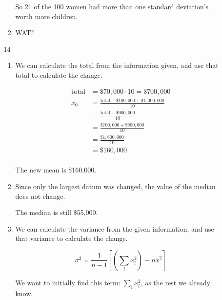 \documentclass[12pt,letterpaper]{article}
\begin{document}
\begin{enumerate}
\begin{enumerate}
\begin{enumerate}[label=(\arabic*)]
              So 21 of the 100 women had more than one standard deviation's worth more children.

            \item
              WAT!!
          \end{enumerate}
        \item [14]
          \begin{enumerate}[label=(\arabic*)]
            \item
              We can calculate the total from the information given,
              and use that total to calculate the change.

              \begin{align*}
                \text{total} &= \$70,000 \cdot 10 = \$700,000 \\
                \overline{x_0} &= \frac{\text{total} - \$100,000 + \$1,000,000}{10} \\
                &= \frac{\text{total} + \$900,000}{10} \\
                &= \frac{\$700,000 + \$900,000}{10} \\
                &= \frac{\$1,600,000}{10} \\
                &= \$160,000 \\
              \end{align*}

              The new mean is \$160,000.

            \item
              Since only the largest datum was changed,
              the value of the median does not change.

              The median is still \$55,000.

            \item
              We can calculate the variance from the given information,
              and use that variance to calculate the change.

              \[
                \sigma^2 = \frac{1}{n - 1} \left[\left(\sum_{i} x_i^2\right) - n \overline{x}^2\right]
              \]

              We want to initially find this term: $\sum_{i} x_i^2$, as the rest we already know.


\end{enumerate}
\end{enumerate}
\end{enumerate}
\end{document}
